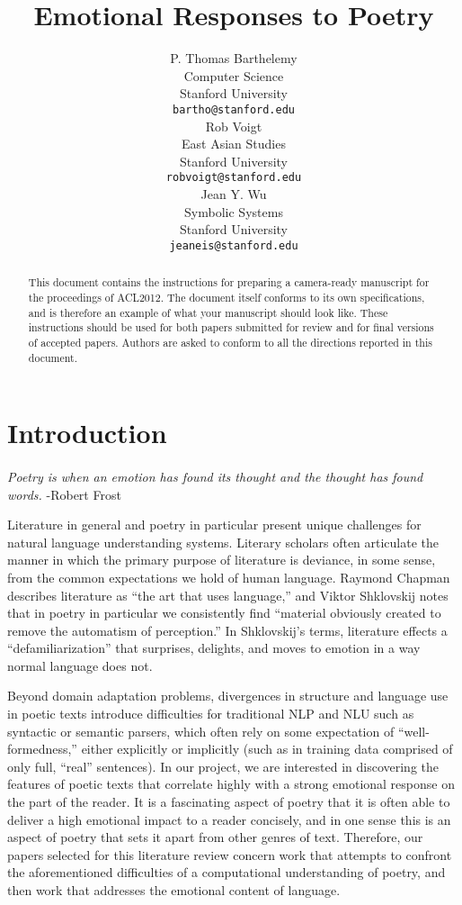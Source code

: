 \documentclass[11pt]{article}
\title{Emotional Responses to Poetry}
\author{P. Thomas Barthelemy \\
  Computer Science\\
  Stanford University \\
  {\tt bartho@stanford.edu} \\\And
  Rob Voigt \\
  East Asian Studies \\
  Stanford University \\
  {\tt robvoigt@stanford.edu} \\\And
  Jean Y. Wu \\
  Symbolic Systems  \\
  Stanford University\\
  {\tt jeaneis@stanford.edu} \\}
\date{}
\begin{document}
\maketitle
\begin{abstract}
  This document contains the instructions for preparing a camera-ready manuscript for the proceedings of ACL2012. The document itself conforms to its own specifications, and is therefore an example of what your manuscript should look like. These instructions should be used for both papers submitted for review and for final versions of accepted papers. Authors are asked to conform to all the directions reported in this document.
\end{abstract}

\section{Introduction}

\paragraph{}
\emph{Poetry is when an emotion has found its thought and the thought has found words.}
-Robert Frost

Literature in general and poetry in particular present unique challenges for natural language understanding systems. Literary scholars often articulate the manner in which the primary purpose of literature is deviance, in some sense, from the common expectations we hold of human language. Raymond Chapman describes literature as “the art that uses language,” and Viktor Shklovskij notes that in poetry in particular we consistently find “material obviously created to remove the automatism of perception.” In Shklovskij's terms, literature effects a “defamiliarization” that surprises, delights, and moves to emotion in a way normal language does not.

Beyond domain adaptation problems, divergences in structure and language use in poetic texts introduce difficulties for traditional NLP and NLU such as syntactic or semantic parsers, which often rely on some expectation of “well-formedness,” either explicitly or implicitly (such as in training data comprised of only full, “real” sentences). In our project, we are interested in discovering the features of poetic texts that correlate highly with a strong emotional response on the part of the reader. It is a fascinating aspect of poetry that it is often able to deliver a high emotional impact to a reader concisely, and in one sense this is an aspect of poetry that sets it apart from other genres of text. Therefore, our papers selected for this literature review concern work that attempts to confront the aforementioned difficulties of a computational understanding of poetry, and then work that addresses the emotional content of language.
\end{document}
